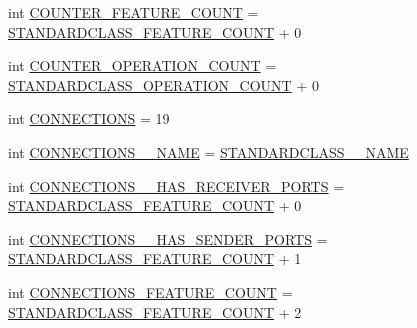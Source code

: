 \begin{DoxyCompactItemize}
\item 
int \hyperlink{interfaceshootingmachineemfmodel_1_1_shootingmachineemfmodel_package_ad6208c374c154f320a71b15e424089ff}{C\-O\-U\-N\-T\-E\-R\-\_\-\-F\-E\-A\-T\-U\-R\-E\-\_\-\-C\-O\-U\-N\-T} = \hyperlink{interfaceshootingmachineemfmodel_1_1_shootingmachineemfmodel_package_a14037f66989b3107e402142df96ee9aa}{S\-T\-A\-N\-D\-A\-R\-D\-C\-L\-A\-S\-S\-\_\-\-F\-E\-A\-T\-U\-R\-E\-\_\-\-C\-O\-U\-N\-T} + 0
\item 
int \hyperlink{interfaceshootingmachineemfmodel_1_1_shootingmachineemfmodel_package_ac8ea781de85388207a4af140694d93c0}{C\-O\-U\-N\-T\-E\-R\-\_\-\-O\-P\-E\-R\-A\-T\-I\-O\-N\-\_\-\-C\-O\-U\-N\-T} = \hyperlink{interfaceshootingmachineemfmodel_1_1_shootingmachineemfmodel_package_a2fe5d848cfe0a02fe5609e2c5ed7e7c7}{S\-T\-A\-N\-D\-A\-R\-D\-C\-L\-A\-S\-S\-\_\-\-O\-P\-E\-R\-A\-T\-I\-O\-N\-\_\-\-C\-O\-U\-N\-T} + 0
\item 
int \hyperlink{interfaceshootingmachineemfmodel_1_1_shootingmachineemfmodel_package_a8a76dc627f9336bbd84e2f73057f5f54}{C\-O\-N\-N\-E\-C\-T\-I\-O\-N\-S} = 19
\item 
int \hyperlink{interfaceshootingmachineemfmodel_1_1_shootingmachineemfmodel_package_ae65f6a808aa6f9db8f48fba1209cd485}{C\-O\-N\-N\-E\-C\-T\-I\-O\-N\-S\-\_\-\-\_\-\-N\-A\-M\-E} = \hyperlink{interfaceshootingmachineemfmodel_1_1_shootingmachineemfmodel_package_a06475d7d54d52ee19b2aaf4d5d73c738}{S\-T\-A\-N\-D\-A\-R\-D\-C\-L\-A\-S\-S\-\_\-\-\_\-\-N\-A\-M\-E}
\item 
int \hyperlink{interfaceshootingmachineemfmodel_1_1_shootingmachineemfmodel_package_a3760c55c51ab5f6ecc162f371ad4f14a}{C\-O\-N\-N\-E\-C\-T\-I\-O\-N\-S\-\_\-\-\_\-\-H\-A\-S\-\_\-\-R\-E\-C\-E\-I\-V\-E\-R\-\_\-\-P\-O\-R\-T\-S} = \hyperlink{interfaceshootingmachineemfmodel_1_1_shootingmachineemfmodel_package_a14037f66989b3107e402142df96ee9aa}{S\-T\-A\-N\-D\-A\-R\-D\-C\-L\-A\-S\-S\-\_\-\-F\-E\-A\-T\-U\-R\-E\-\_\-\-C\-O\-U\-N\-T} + 0
\item 
int \hyperlink{interfaceshootingmachineemfmodel_1_1_shootingmachineemfmodel_package_a5e6aac734628e977a0c8ef070feb784b}{C\-O\-N\-N\-E\-C\-T\-I\-O\-N\-S\-\_\-\-\_\-\-H\-A\-S\-\_\-\-S\-E\-N\-D\-E\-R\-\_\-\-P\-O\-R\-T\-S} = \hyperlink{interfaceshootingmachineemfmodel_1_1_shootingmachineemfmodel_package_a14037f66989b3107e402142df96ee9aa}{S\-T\-A\-N\-D\-A\-R\-D\-C\-L\-A\-S\-S\-\_\-\-F\-E\-A\-T\-U\-R\-E\-\_\-\-C\-O\-U\-N\-T} + 1
\item 
int \hyperlink{interfaceshootingmachineemfmodel_1_1_shootingmachineemfmodel_package_ac0d9cfff44a875c0371733b0c3f596bc}{C\-O\-N\-N\-E\-C\-T\-I\-O\-N\-S\-\_\-\-F\-E\-A\-T\-U\-R\-E\-\_\-\-C\-O\-U\-N\-T} = \hyperlink{interfaceshootingmachineemfmodel_1_1_shootingmachineemfmodel_package_a14037f66989b3107e402142df96ee9aa}{S\-T\-A\-N\-D\-A\-R\-D\-C\-L\-A\-S\-S\-\_\-\-F\-E\-A\-T\-U\-R\-E\-\_\-\-C\-O\-U\-N\-T} + 2

\end{DoxyCompactItemize}
